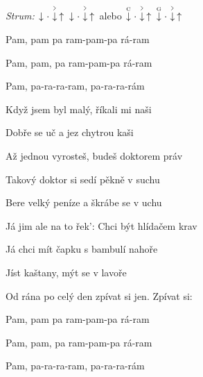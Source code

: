 \begin{song}


\begin{headerbox}
\RaiseBoxWithAccents
\textit{Strum:} $\Down\Miss\AccentDown\Up\ \Down\Miss\AccentDown\Up$ alebo $\PluckDown{C}\Miss\AccentDown\Up\ \PluckDown{G}\Miss\AccentDown\Up$
\end{headerbox}

\begin{vchordbox}
\vspace{-5em}
\end{vchordbox}

\Large

\bigskip

Pam, pam pa ram-pam-pa rá-ram \par
Pam, pam, pa ram-pam-pa rá-ram \par
{}Pam, pa-ra-ra-ram, pa-ra-ra-rám \par

\bigskip

Když jsem byl malý, říkali mi naši \par
Dobře se uč a jez chytrou kaši \par
{} Až jednou vyrosteš,  budeš doktorem práv \par
{} Takový doktor si sedí pěkně v suchu \par
Bere velký peníze a škrábe se v uchu \par
{}Já jim ale na to řek': Chci být hlídačem krav \par

\bigskip

\begin{chorusbox}{\Refren}
Já chci mít čapku s bambulí nahoře \par
Jíst kaštany, mýt se v lavoře \par
{} Od rána po celý den zpívat si jen.  Zpívat si: \par

\bigskip

Pam, pam pa ram-pam-pa rá-ram \par
Pam, pam, pa ram-pam-pa rá-ram \par
{}Pam, pa-ra-ra-ram, pa-ra-ra-rám \par
\end{chorusbox}


\end{song}
